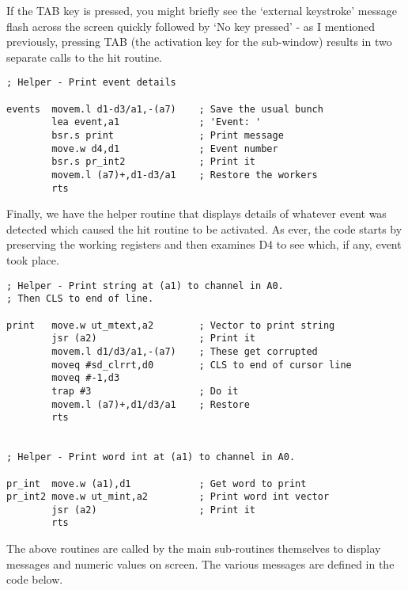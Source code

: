 If the TAB key is pressed, you might briefly see the `external keystroke'
        message flash across the screen quickly followed by `No key pressed' -{} as I
        mentioned previously, pressing TAB (the activation key for the sub-{}window) results
        in two separate calls to the hit routine.

\begin{lstlisting}[firstnumber=1,]
; Helper - Print event details

events  movem.l d1-d3/a1,-(a7)    ; Save the usual bunch
        lea event,a1              ; 'Event: '
        bsr.s print               ; Print message
        move.w d4,d1              ; Event number
        bsr.s pr_int2             ; Print it
        movem.l (a7)+,d1-d3/a1    ; Restore the workers
        rts
\end{lstlisting}

Finally, we have the helper routine that displays details of whatever event
        was detected which caused the hit routine to be activated. As ever, the code
        starts by preserving the working registers and then examines D4 to see which, if
        any, event took place.

\begin{lstlisting}[firstnumber=1,]
; Helper - Print string at (a1) to channel in A0. 
; Then CLS to end of line.

print   move.w ut_mtext,a2        ; Vector to print string
        jsr (a2)                  ; Print it
        movem.l d1/d3/a1,-(a7)    ; These get corrupted
        moveq #sd_clrrt,d0        ; CLS to end of cursor line
        moveq #-1,d3
        trap #3                   ; Do it
        movem.l (a7)+,d1/d3/a1    ; Restore
        rts


; Helper - Print word int at (a1) to channel in A0.

pr_int  move.w (a1),d1            ; Get word to print
pr_int2 move.w ut_mint,a2         ; Print word int vector
        jsr (a2)                  ; Print it
        rts
\end{lstlisting}

The above routines are called by the main sub-{}routines themselves to display
        messages and numeric values on screen. The various messages are defined in the
        code below.


